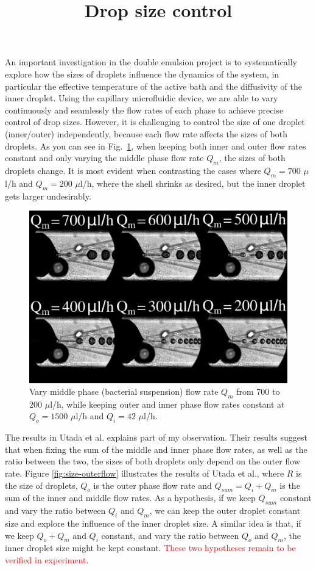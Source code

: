\documentclass[onecolumn,aps, pre,amsmath,amssymb,longbibliography,12pt]{revtex4-2}
\begin{document}
\title{Drop size control}
\maketitle

An important investigation in the double emulsion project is to systematically explore how the sizes of droplets influence the dynamics of the system,
in particular the effective temperature of the active bath and the diffusivity of the inner droplet.
Using the capillary microfluidic device, we are able to vary continuously and seamlessly the flow rates of each phase to achieve precise control of drop sizes.
However, it is challenging to control the size of one droplet (inner/outer) independently, because each flow rate affects the sizes of both droplets.
As you can see in Fig.~\ref{fig:vary-middle}, when keeping both inner and outer flow rates constant and only varying the middle phase flow rate $Q_m$, the sizes of both droplets change.
It is most evident when contrasting the cases where $Q_m=700$ $\mu$l/h and $Q_m=200$ $\mu$l/h, where the shell shrinks as desired, but the inner droplet gets larger undesirably.

\begin{figure}[h]
  \includegraphics[width=5in]{vary-middle.png}
  \caption{Vary middle phase (bacterial suspension) flow rate $Q_m$ from 700 to 200 $\mu$l/h, while keeping outer and inner phase flow rates constant at $Q_o=1500$ $\mu$l/h and $Q_i=42$ $\mu$l/h.}
  \label{fig:vary-middle}
\end{figure}

The results in Utada et al. \cite{Utada2005} explains part of my observation.
Their results suggest that when fixing the sum of the middle and inner phase flow rates, as well as the ratio between the two, the sizes of both droplets only depend on the outer flow rate.
Figure \ref{fig:size-outerflow} illustrates the results of Utada et al., where $R$ is the size of droplets, $Q_o$ is the outer phase flow rate and $Q_{sum}=Q_i+Q_m$ is the sum of the inner and middle flow rates.
As a hypothesis, if we keep $Q_{sum}$ constant and vary the ratio between $Q_i$ and $Q_m$, we can keep the outer droplet constant size and explore the influence of the inner droplet size.
A similar idea is that, if we keep $Q_o+Q_m$ and $Q_i$ constant, and vary the ratio between $Q_o$ and $Q_m$, the inner droplet size might be kept constant.
\textcolor{red}{These two hypotheses remain to be verified in experiment.}
\end{document}
